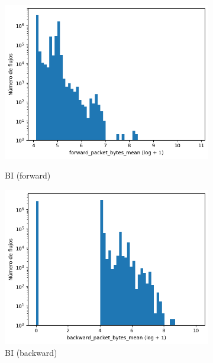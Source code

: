\begin{figure}[H]
\begin{subfigure}[b]{0.26\textwidth}
        \includegraphics[width=\textwidth]{media/packet_pincer_botiot/forward_packet_bytes_mean_log_x_log_y.png}
        \caption{BI (forward)}
        \includegraphics[width=\textwidth]{media/packet_pincer_botiot/backward_packet_bytes_mean_log_x_log_y.png}
        \caption{BI (backward)}
    \end{subfigure}
    \hfill
    \begin{subfigure}[b]{0.26\textwidth}
        \centering

\end{subfigure}
\end{figure}
